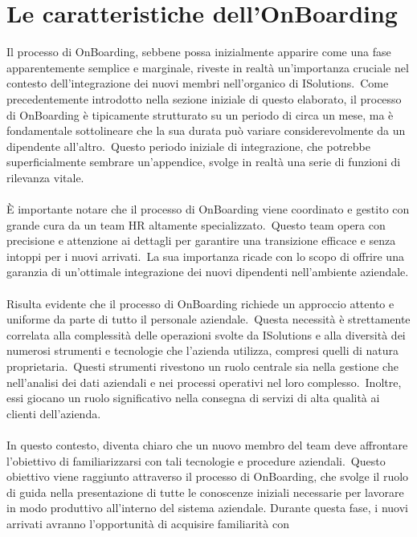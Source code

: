 \chapter{Le caratteristiche dell'OnBoarding}\label{chapter:caratteristiche_onboarding}
Il processo di OnBoarding, sebbene possa inizialmente apparire come una fase apparentemente semplice e marginale, 
riveste in realtà un'importanza cruciale nel contesto dell'integrazione dei nuovi membri nell'organico di ISolutions.\
Come precedentemente introdotto nella sezione iniziale di questo elaborato,
il processo di OnBoarding è tipicamente strutturato su un periodo di circa un mese, ma è fondamentale sottolineare che 
la sua durata può variare considerevolmente da un dipendente all'altro.\ Questo periodo iniziale di integrazione, 
che potrebbe superficialmente sembrare un'appendice, svolge in realtà una serie di funzioni di rilevanza vitale.
\\ \\
È importante notare che il processo di OnBoarding viene coordinato e gestito con grande cura da un team HR altamente specializzato.\ 
Questo team opera con precisione e attenzione ai dettagli per garantire una transizione efficace e senza intoppi per i nuovi arrivati.\ 
La sua importanza ricade con lo scopo di offrire una garanzia di un'ottimale integrazione dei nuovi dipendenti nell'ambiente aziendale.
\\ \\
Risulta evidente che il processo di OnBoarding richiede un approccio attento e uniforme da parte di tutto il personale aziendale.\ 
Questa necessità è strettamente correlata alla complessità delle operazioni svolte da ISolutions e alla diversità dei numerosi 
strumenti e tecnologie che l'azienda utilizza, compresi quelli di natura proprietaria.\ Questi strumenti rivestono un ruolo 
centrale sia nella gestione che nell'analisi dei dati aziendali e nei processi operativi nel loro complesso.\ 
Inoltre, essi giocano un ruolo significativo nella consegna di servizi di alta qualità ai clienti dell'azienda.
\\ \\
In questo contesto, diventa chiaro che un nuovo membro del team deve affrontare l'obiettivo di familiarizzarsi 
con tali tecnologie e procedure aziendali.\ Questo obiettivo viene raggiunto attraverso il processo di OnBoarding, 
che svolge il ruolo di guida nella presentazione di tutte le conoscenze iniziali necessarie per lavorare in modo produttivo 
all'interno del sistema aziendale. Durante questa fase, i nuovi arrivati avranno l'opportunità di acquisire familiarità con 
